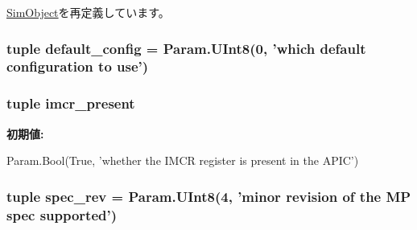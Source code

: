 \hyperlink{classm5_1_1SimObject_1_1SimObject_a17da7064bc5c518791f0c891eff05fda}{SimObject}を再定義しています。\hypertarget{classIntelMP_1_1X86IntelMPFloatingPointer_aa65e3abaff458d5eaeb83c79cbdfc7ed}{
\subsubsection[{default\_\-config}]{\setlength{\rightskip}{0pt plus 5cm}tuple {\bf default\_\-config} = Param.UInt8(0, 'which default configuration to use')}}
\label{classIntelMP_1_1X86IntelMPFloatingPointer_aa65e3abaff458d5eaeb83c79cbdfc7ed}
\hypertarget{classIntelMP_1_1X86IntelMPFloatingPointer_a8b11ab6c874299f1d440bdcddc8422b5}{
\subsubsection[{imcr\_\-present}]{\setlength{\rightskip}{0pt plus 5cm}tuple {\bf imcr\_\-present}}}
\label{classIntelMP_1_1X86IntelMPFloatingPointer_a8b11ab6c874299f1d440bdcddc8422b5}
{\bfseries 初期値:}
\begin{DoxyCode}
Param.Bool(True,
            'whether the IMCR register is present in the APIC')
\end{DoxyCode}
\hypertarget{classIntelMP_1_1X86IntelMPFloatingPointer_a524402a2c5b41fc09fdbe3ecc1c95abb}{
\subsubsection[{spec\_\-rev}]{\setlength{\rightskip}{0pt plus 5cm}tuple {\bf spec\_\-rev} = Param.UInt8(4, 'minor revision of the MP spec supported')}}
\label{classIntelMP_1_1X86IntelMPFloatingPointer_a524402a2c5b41fc09fdbe3ecc1c95abb}

